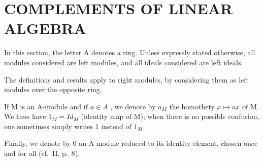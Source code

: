 \section{COMPLEMENTS OF LINEAR ALGEBRA}

In this section, the letter A denotes a ring. Unless expressly stated otherwise, all modules considered are left modules, and all ideals considered are left ideals.

The definitions and results apply to right modules, by considering them as left modules over the opposite ring.

If M is an A-module and if \(a \in A\) , we denote by \(a_{M}\) the homothety \(x \mapsto ax\) of M. We thus have \(1_{M} = Id_{M}\) (identity map of M); when there is no possible confusion, one sometimes simply writes 1 instead of \(1_{M}\) .

Finally, we denote by 0 an A-module reduced to its identity element, chosen once and for all (cf.~II, p.~8).

